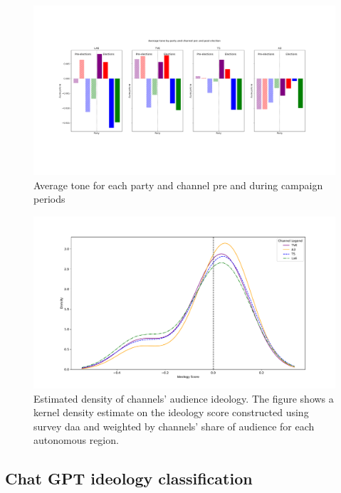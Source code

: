 \documentclass[12pt]{article}
\begin{document}
	
	\begin{figure}[H]
		\centering
		\includegraphics[width=150mm]{figures/average_tone_pre_post_election.png}
		\caption{Average tone for each party and channel pre and during campaign periods}
		\label{fig:party_decomposition}
	\end{figure}
	
	
	\begin{figure}[H]
		\centering
		\includegraphics[width=150mm]{figures/channel_ideology_density_python}
		\caption{Estimated density of channels' audience ideology. The figure shows a kernel density estimate on the ideology score constructed using survey daa and weighted by channels' share of audience for each autonomous region. }
		\label{fig:density}
	\end{figure}
	
	
	
	
	
	
	
	
	\subsection{Chat GPT ideology classification}\label{sec:chat_gpt}
	
\end{document}
